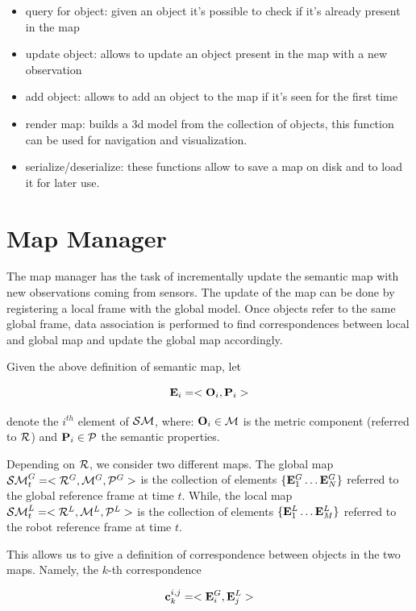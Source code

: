\documentclass{article}
\begin{document}
	\begin{itemize}
		\item query for object: given an object it's possible to check if it's already present in the map
		\item update object: allows to update an object present in the map with a new observation
		\item add object: allows to add an object to the map if it's seen for the first time
		\item render map: builds a 3d model from the collection of objects, this function can be used for navigation and visualization.
		\item serialize/deserialize: these functions allow to save a map on disk and to load it for later use.
	\end{itemize}
	
	\section{Map Manager}
	
	The map manager has the task of incrementally update the semantic map with new observations coming from sensors. The update of the map can be done by registering a local frame with the global model. Once objects refer to the same global frame, data association is performed to find correspondences between local and global map and update the global map accordingly.
	
	Given the above definition of semantic map, let 
	
	\begin{equation}
		\mathbf{E}_i = < \mathbf{O}_i,\mathbf{P}_i >
	\end{equation}
	
	\noindent
	denote the $i^{th}$ element of $\mathcal{SM}$, where: $\mathbf{O}_i \in \mathcal{M}$ is the metric component (referred to $\mathcal{R}$) and $\mathbf{P}_i \in \mathcal{P}$ the semantic properties. 
	
	Depending on $\mathcal{R}$, we consider two different maps. The global map $\mathcal{SM}^G_t = < \mathcal{R}^G, \mathcal{M}^G, \mathcal{P}^G >$  is the collection of elements $\{ \mathbf{E}_1^G \dots \mathbf{E}_N^G \}$ referred to the global reference frame at time $t$. While, the local map $\mathcal{SM}^L_t = < \mathcal{R}^L, \mathcal{M}^L, \mathcal{P}^L >$ is the collection of elements $\{ \mathbf{E}_1^L \dots \mathbf{E}_M^L \}$ referred to the robot reference frame at time $t$. 
	
	This allows us to give a definition of correspondence between objects in the two maps. Namely, the $k$-th correspondence
	 
	\begin{equation}
		\mathbf{c}^{i,j}_k = <\mathbf{E}_i^G,\mathbf{E}_j^L> 
	\end{equation}
	
\end{document}
